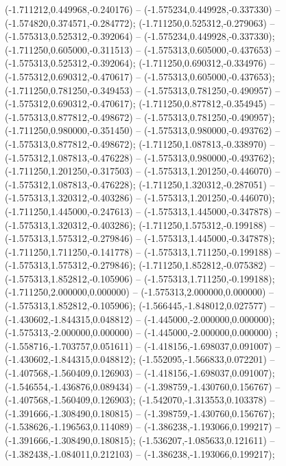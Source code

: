  (-1.711212,0.449968,-0.240176) -- (-1.575234,0.449928,-0.337330) -- (-1.574820,0.374571,-0.284772);
 (-1.711250,0.525312,-0.279063) -- (-1.575313,0.525312,-0.392064) -- (-1.575234,0.449928,-0.337330);
 (-1.711250,0.605000,-0.311513) -- (-1.575313,0.605000,-0.437653) -- (-1.575313,0.525312,-0.392064);
 (-1.711250,0.690312,-0.334976) -- (-1.575312,0.690312,-0.470617) -- (-1.575313,0.605000,-0.437653);
 (-1.711250,0.781250,-0.349453) -- (-1.575313,0.781250,-0.490957) -- (-1.575312,0.690312,-0.470617);
 (-1.711250,0.877812,-0.354945) -- (-1.575313,0.877812,-0.498672) -- (-1.575313,0.781250,-0.490957);
 (-1.711250,0.980000,-0.351450) -- (-1.575313,0.980000,-0.493762) -- (-1.575313,0.877812,-0.498672);
 (-1.711250,1.087813,-0.338970) -- (-1.575312,1.087813,-0.476228) -- (-1.575313,0.980000,-0.493762);
 (-1.711250,1.201250,-0.317503) -- (-1.575313,1.201250,-0.446070) -- (-1.575312,1.087813,-0.476228);
 (-1.711250,1.320312,-0.287051) -- (-1.575313,1.320312,-0.403286) -- (-1.575313,1.201250,-0.446070);
 (-1.711250,1.445000,-0.247613) -- (-1.575313,1.445000,-0.347878) -- (-1.575313,1.320312,-0.403286);
 (-1.711250,1.575312,-0.199188) -- (-1.575313,1.575312,-0.279846) -- (-1.575313,1.445000,-0.347878);
 (-1.711250,1.711250,-0.141778) -- (-1.575313,1.711250,-0.199188) -- (-1.575313,1.575312,-0.279846);
 (-1.711250,1.852812,-0.075382) -- (-1.575313,1.852812,-0.105906) -- (-1.575313,1.711250,-0.199188);
 (-1.711250,2.000000,0.000000) -- (-1.575313,2.000000,0.000000) -- (-1.575313,1.852812,-0.105906);
 (-1.566445,-1.848012,0.027577) -- (-1.430602,-1.844315,0.048812) -- (-1.445000,-2.000000,0.000000);
 (-1.575313,-2.000000,0.000000) -- (-1.445000,-2.000000,0.000000) ;
 (-1.558716,-1.703757,0.051611) -- (-1.418156,-1.698037,0.091007) -- (-1.430602,-1.844315,0.048812);
 (-1.552095,-1.566833,0.072201) -- (-1.407568,-1.560409,0.126903) -- (-1.418156,-1.698037,0.091007);
 (-1.546554,-1.436876,0.089434) -- (-1.398759,-1.430760,0.156767) -- (-1.407568,-1.560409,0.126903);
 (-1.542070,-1.313553,0.103378) -- (-1.391666,-1.308490,0.180815) -- (-1.398759,-1.430760,0.156767);
 (-1.538626,-1.196563,0.114089) -- (-1.386238,-1.193066,0.199217) -- (-1.391666,-1.308490,0.180815);
 (-1.536207,-1.085633,0.121611) -- (-1.382438,-1.084011,0.212103) -- (-1.386238,-1.193066,0.199217);

